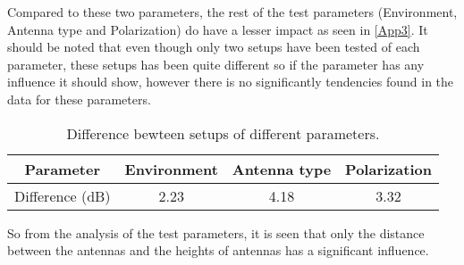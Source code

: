 Compared to these two parameters, the rest of the test parameters (Environment, Antenna type and Polarization) do have a lesser impact as seen in \autoref{App3}. It should be noted that even though only two setups have been tested of each parameter, these setups has been quite different so if the parameter has any influence it should show, however there is no significantly tendencies found in the data for these parameters. 


\begin{table}[H]
\centering
\begin{tabular}{|c|c|c|c|}
\hline
Parameter& Environment & Antenna type & Polarization\\\hline
Difference (dB) & 2.23 & 4.18 & 3.32 \\\hline
\end{tabular}
\caption{Difference bewteen setups of different parameters.}
\label{App3}
\end{table}



So from the analysis of the test parameters, it is seen that only the distance between the antennas and the heights of antennas has a significant influence. 

